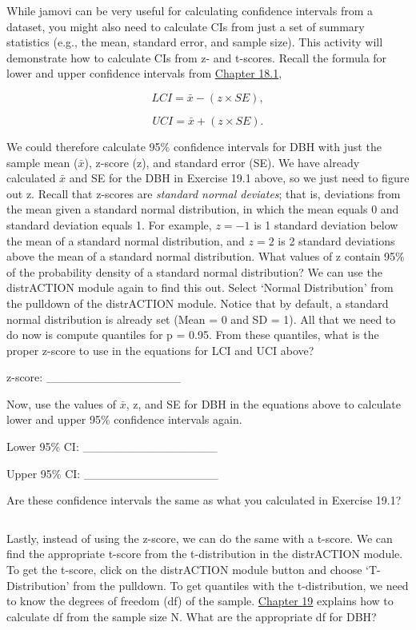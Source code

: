 \documentclass[
  openany]{scrbook}
\begin{document}
While jamovi can be very useful for calculating confidence intervals from a dataset, you might also need to calculate CIs from just a set of summary statistics (e.g., the mean, standard error, and sample size).
This activity will demonstrate how to calculate CIs from z- and t-scores.
Recall the formula for lower and upper confidence intervals from \protect\hyperlink{Chapter_18.htmlux5cux23normal-distribution-cis}{Chapter 18.1},

\[LCI = \bar{x} - (z \times SE),\]

\[UCI = \bar{x} + (z \times SE).\]

We could therefore calculate 95\% confidence intervals for DBH with just the sample mean (\(\bar{x}\)), z-score (z), and standard error (SE).
We have already calculated \(\bar{x}\) and SE for the DBH in Exercise 19.1 above, so we just need to figure out z.
Recall that z-scores are \emph{standard normal deviates}; that is, deviations from the mean given a standard normal distribution, in which the mean equals 0 and standard deviation equals 1.
For example, \(z = -1\) is 1 standard deviation below the mean of a standard normal distribution, and \(z = 2\) is 2 standard deviations above the mean of a standard normal distribution.
What values of z contain 95\% of the probability density of a standard normal distribution?
We can use the distrACTION module again to find this out.
Select `Normal Distribution' from the pulldown of the distrACTION module.
Notice that by default, a standard normal distribution is already set (Mean = 0 and SD = 1).
All that we need to do now is compute quantiles for p = 0.95.
From these quantiles, what is the proper z-score to use in the equations for LCI and UCI above?

z-score: \_\_\_\_\_\_\_\_\_\_\_\_\_\_\_\_

Now, use the values of \(\bar{x}\), z, and SE for DBH in the equations above to calculate lower and upper 95\% confidence intervals again.

Lower 95\% CI: \_\_\_\_\_\_\_\_\_\_\_\_\_\_\_\_

Upper 95\% CI: \_\_\_\_\_\_\_\_\_\_\_\_\_\_\_\_

Are these confidence intervals the same as what you calculated in Exercise 19.1?

\begin{verbatim}

\end{verbatim}

Lastly, instead of using the z-score, we can do the same with a t-score.
We can find the appropriate t-score from the t-distribution in the distrACTION module.
To get the t-score, click on the distrACTION module button and choose `T-Distribution' from the pulldown.
To get quantiles with the t-distribution, we need to know the degrees of freedom (df) of the sample.
\protect\hyperlink{Chapter_19}{Chapter 19} explains how to calculate df from the sample size N.
What are the appropriate df for DBH?
\end{document}
